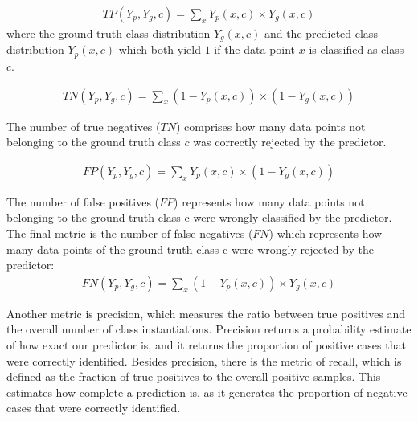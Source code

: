 \begin{equation}
\begin{split}
TP\left ( Y_{p},Y_{g},c \right )=\sum_{x}^{}Y_{p}\left ( x,c \right )\times Y_{g}\left ( x, c \right )
\label{}
\end{split}
\end{equation}
where the ground truth class distribution $Y_{g} (x, c)$ and the predicted class distribution $Y_{p} (x, c)$ which both yield $1$ if the data point $x$  is classified as class $c$.

\begin{equation}
\begin{split}
TN\left ( Y_{p},Y_{g},c \right )=\sum_{x}^{}\left (1-Y_{p}\left ( x,c \right )  \right )\times \left ( 1-Y_{g}\left ( x,c \right ) \right ) 
\label{}
\end{split}
\end{equation}

The number of true negatives ($TN$) comprises how many data points not belonging to the ground truth class $c$ was correctly rejected by the predictor.

\begin{equation}
\begin{split}
FP\left ( Y_{p},Y_{g},c \right )=\sum_{x}^{}Y_{p}\left ( x,c \right )\times \left ( 1-Y_{g}\left ( x,c \right ) \right )
\label{}
\end{split}
\end{equation}

The number of false positives ($FP$) represents how many data points not belonging to the ground truth class c were wrongly classified by the predictor.
The final metric is the number of false negatives ($FN$) which represents how many data points of the ground truth class c were wrongly rejected by the predictor:
\begin{equation}
\begin{split}
FN\left ( Y_{p},Y_{g},c \right )=\sum_{x}^{}\left (1-Y_{p}\left ( x,c \right )  \right )\times Y_{g}\left ( x,c \right ) 
\label{}
\end{split}
\end{equation}


Another metric is precision, which measures the ratio between true positives and the overall number of class instantiations. Precision returns a probability estimate of how exact our predictor is, and it returns the proportion of positive cases that were correctly identified. Besides precision, there is the metric of recall, which is defined as the fraction of true positives to the overall positive samples. This estimates how complete a prediction is, as it generates the proportion of negative cases that were correctly identified.

